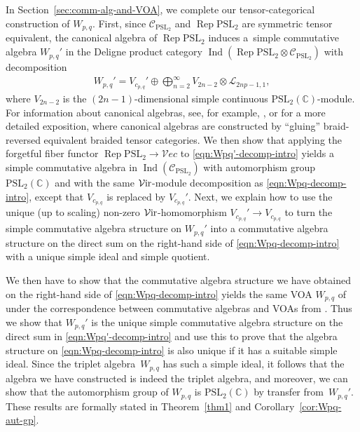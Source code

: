 \documentclass[pdftex]{sigma}
\numberwithin{equation}{section}
\theoremstyle{definition}
\begin{document}
In Section~\ref{sec:comm-alg-and-VOA}, we complete our tensor-categorical construction of $W_{p,q}$. First, since $\mathcal{C}_{\mathrm{PSL}_2}$ and $\operatorname{Rep} \mathrm{PSL}_2$ are symmetric tensor equivalent, the canonical algebra of $\operatorname{Rep} \mathrm{PSL}_2$ induces a~simple commutative algebra $W_{p,q}'$ in the Deligne product category $\operatorname{Ind}(\operatorname{Rep} \mathrm{PSL}_2\otimes\mathcal{C}_{\mathrm{PSL}_2})$ with decomposition
\begin{gather}\label{eqn:Wpq'-decomp-intro}
W_{p,q}'=V_{c_{p,q}}'\oplus\bigoplus_{n=2}^\infty V_{2n-2}\otimes\mathcal{L}_{2np-1,1},
\end{gather}
where $V_{2n-2}$ is the $(2n-1)$-dimensional simple continuous $\mathrm{PSL}_2(\mathbb{C})$-module. For information about canonical algebras, see, for example, \cite{EGNO}, or \cite{CKM2} for a more detailed exposition, where canonical algebras are constructed by ``gluing'' braid-reversed equivalent braided tensor categories. We then show that applying the forgetful fiber functor $\operatorname{Rep} \mathrm{PSL}_2\rightarrow\mathcal{V}ec$ to \eqref{eqn:Wpq'-decomp-intro} yields a simple commutative algebra in $\operatorname{Ind}(\mathcal{C}_{\mathrm{PSL}_2})$ with automorphism group $\mathrm{PSL}_2(\mathbb{C})$ and with the same $\mathcal{V}{\rm ir}$-module decomposition as \eqref{eqn:Wpq-decomp-intro}, except that $V_{c_{p,q}}$ is replaced by $V_{c_{p,q}}'$.
Next, we explain how to use the unique (up to scaling) non-zero $\mathcal{V}{\rm ir}$-homomorphism $V_{c_{p,q}}'\rightarrow V_{c_{p,q}}$ to turn the simple commutative algebra structure on $W_{p,q}'$ into a commutative algebra structure on the direct sum on the right-hand side of \eqref{eqn:Wpq-decomp-intro} with a unique simple ideal and simple quotient.

We then have to show that the commutative algebra structure we have obtained on the right-hand side of \eqref{eqn:Wpq-decomp-intro} yields the same VOA $W_{p,q}$ of \cite{FGST1-Log} under the correspondence between commutative algebras and VOAs from \cite{HKL}. Thus we show that $W_{p,q}'$ is the unique simple commutative algebra structure on the direct sum in \eqref{eqn:Wpq'-decomp-intro} and use this to prove that the algebra structure on \eqref{eqn:Wpq-decomp-intro} is also unique if it has a suitable simple ideal. Since the triplet algebra~$W_{p,q}$ has such a simple ideal, it follows that the algebra we have constructed is indeed the triplet algebra, and moreover, we can show that the automorphism group of $W_{p,q}$ is $\mathrm{PSL}_2(\mathbb{C})$ by transfer from~$W_{p,q}'$. These results are formally stated in Theorem~\ref{thm1} and Corollary~\ref{cor:Wpq-aut-gp}.
\end{document}
